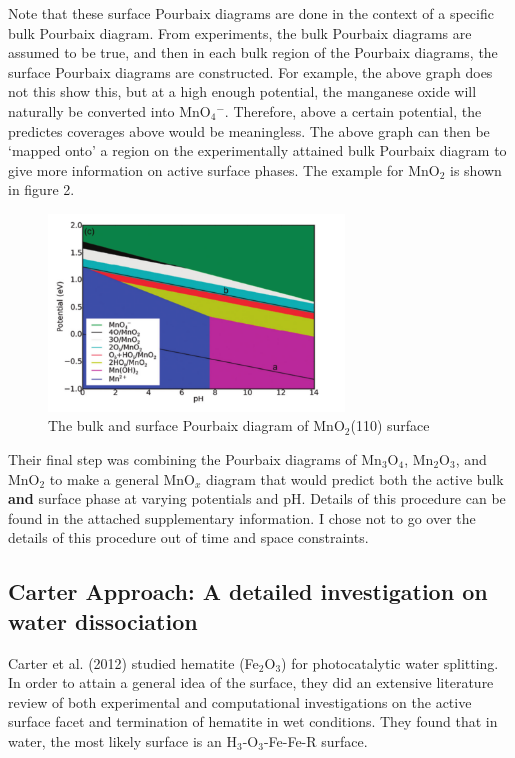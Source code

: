 \documentclass[11pt]{article}
\begin{document}
   Note that these surface Pourbaix diagrams are done in the context
   of a specific bulk Pourbaix diagram. 
   From experiments, the bulk Pourbaix diagrams are assumed to be
   true, and then in each bulk region of the Pourbaix diagrams, 
   the surface Pourbaix diagrams are constructed. 
   For example, the above graph does not this show this,
   but at a high enough potential, the manganese oxide will naturally
   be converted into MnO$_{4}$$^{-}$.
   Therefore, above a certain potential, the predictes coverages above
   would be meaningless.
   The above graph can then be `mapped onto' a region on the
   experimentally attained bulk Pourbaix diagram to give more
   information on active surface phases. The example for MnO$_{2}$ is
   shown in figure 2.

   \begin{figure}[H]
   \centering
   \includegraphics[width=0.7\textwidth]{./pourbaix-mno2.png}
   \caption{\label{fig:MnO_{2}-pourbaix}The bulk and surface Pourbaix diagram of MnO$_{2}$(110) surface}
   \end{figure}
   
   Their final step was combining the Pourbaix diagrams of
   Mn$_{3}$O$_{4}$, Mn$_{2}$O$_{3}$, and MnO$_{2}$ to make a general MnO$_{x}$
   diagram that would predict both the active bulk \textbf{and} surface phase
   at varying potentials and pH. Details of this procedure can be
   found in the attached supplementary information. I chose not to go
   over the details of this procedure out of time and space constraints.
   
\subsection{Carter Approach: A detailed investigation on water dissociation}
\label{sec-2-2}

   Carter et al. (2012) studied hematite (Fe$_{2}$O$_{3}$) for
   photocatalytic water splitting.
   In order to attain a general idea of the surface, they did an
   extensive literature review of both experimental and computational
   investigations on the active surface facet and termination of hematite
   in wet conditions.
   They found that in water, the most likely surface is an
   H$_{3}$-O$_{3}$-Fe-Fe-R surface. 
   
\end{document}

